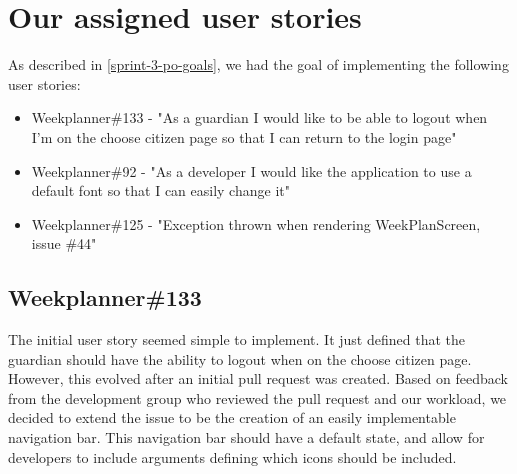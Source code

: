 \section{Our assigned user stories}\label{sec:sprint-3-our-stories}
As described in \autoref{sprint-3-po-goals}, we had the goal of implementing the following user stories:
\begin{itemize}\label{item:our-stories-sprint-3}
    \item Weekplanner\#133 - "As a guardian I would like to be able to logout when I'm on the choose citizen page so that I can return to the login page"
    \item Weekplanner\#92 - "As a developer I would like the application to use a default font so that I can easily change it"
    \item Weekplanner\#125 - "Exception thrown when rendering WeekPlanScreen, issue \#44"
\end{itemize}

\subsection{Weekplanner\#133}
The initial user story seemed simple to implement.
It just defined that the guardian should have the ability to logout when on the choose citizen page.
However, this evolved after an initial pull request was created.
Based on feedback from the development group who reviewed the pull request and our workload, we decided to extend the issue to be the creation of an easily implementable navigation bar.
This navigation bar should have a default state, and allow for developers to include arguments defining which icons should be included.

